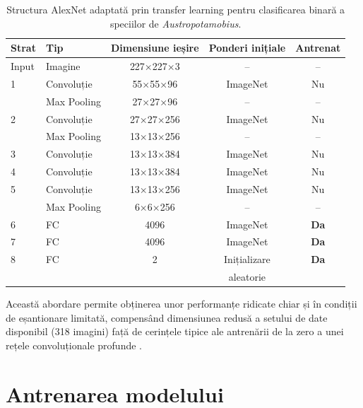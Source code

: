 \begin{table}[H]
\centering
\caption{Structura AlexNet adaptată prin transfer learning pentru
clasificarea binară a speciilor de \textit{Austropotamobius}.}
\label{tab:alexnet_adaptat}
\begin{tabular}{llccc}
\hline
\textbf{Strat} & \textbf{Tip} & \textbf{Dimensiune ieșire} &
\textbf{Ponderi inițiale} & \textbf{Antrenat} \\
\hline
Input   & Imagine      & 227×227×3   & --           & --          \\
\hline
1       & Convoluție   & 55×55×96    & ImageNet     & Nu          \\
        & Max Pooling  & 27×27×96    & --           & --          \\
\hline
2       & Convoluție   & 27×27×256   & ImageNet     & Nu          \\
        & Max Pooling  & 13×13×256   & --           & --          \\
\hline
3       & Convoluție   & 13×13×384   & ImageNet     & Nu          \\
\hline
4       & Convoluție   & 13×13×384   & ImageNet     & Nu          \\
\hline
5       & Convoluție   & 13×13×256   & ImageNet     & Nu          \\
        & Max Pooling  & 6×6×256     & --           & --          \\
\hline
6       & FC           & 4096        & ImageNet     & \textbf{Da} \\
7       & FC           & 4096        & ImageNet     & \textbf{Da} \\
\hline
8       & FC           & 2           & Inițializare & \textbf{Da} \\
        &              &             & aleatorie    &             \\
\hline
\end{tabular}
\end{table}

Această abordare permite obținerea unor performanțe ridicate chiar și în condiții de eșantionare limitată, compensând dimensiunea redusă a setului de date disponibil (318 imagini) față de cerințele tipice ale antrenării de la zero a unei rețele convoluționale profunde \cite{krizhevsky2012imagenet}.






\section{Antrenarea modelului}\label{sec:antrenare}

